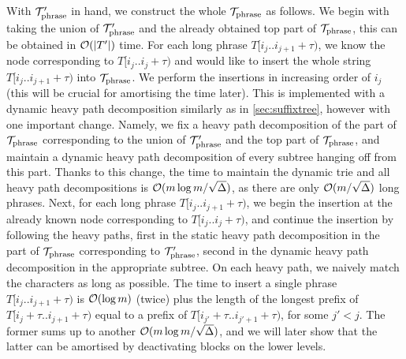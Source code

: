 With $\mathcal{T}_{\mathrm{phrase}}'$ in hand, we construct the whole $\mathcal{T}_{\mathrm{phrase}}$ as follows. We begin with taking the union of $\mathcal{T}_{\mathrm{phrase}}'$ and
the already obtained top part of $\mathcal{T}_{\mathrm{phrase}}$, this can be obtained in $\mathcal{O}(|T'|)$ time. For each long
phrase $T[i_{j}.. i_{j+1}+\tau)$, we know the node corresponding to $T[i_{j}..i_{j}+\tau)$
and would like to insert the whole string $T[i_{j}.. i_{j+1}+\tau)$ into $\mathcal{T}_{\mathrm{phrase}}$.
We perform the insertions in increasing order of $i_j$ (this will be crucial for amortising the time later).
This is implemented with a dynamic heavy path decomposition similarly as in \cref{sec:suffixtree},
however with one important change. Namely, we fix a heavy path decomposition of the
part of $\mathcal{T}_{\mathrm{phrase}}$ corresponding to the union of $\mathcal{T}_{\mathrm{phrase}}'$ and the top part of $\mathcal{T}_{\mathrm{phrase}}$, and maintain a dynamic heavy
path decomposition of every subtree hanging off from this part. Thanks to this change,
the time to maintain the dynamic trie and all heavy path decompositions is $\mathcal{O}(m\log m/\sqrt{\Delta})$,
as there are only $\mathcal{O}(m/\sqrt{\Delta})$ long phrases. Next, for each long phrase
$T[i_{j}..i_{j + 1}+\tau)$, we begin the insertion at the already known node corresponding to $T[i_{j}..i_j+\tau)$,
and continue the insertion by following the heavy paths, first in the static heavy path decomposition
in the part of $\mathcal{T}_{\mathrm{phrase}}$ corresponding to $\mathcal{T}_{\mathrm{phrase}}'$, second in the dynamic heavy path
decomposition in the appropriate subtree.
On each heavy path, we naively match the characters as long as possible.
The time to insert a single phrase $T[i_{j}.. i_{j+1}+\tau)$ is $\mathcal{O}(\log m)$ (twice)
plus the length of the longest prefix
of $T[i_{j}+\tau.. i_{j+1}+\tau)$ equal to a prefix of $T[i_{j'}+\tau.. i_{j'+1}+\tau)$, for some $j'<j$.
The former sums up to another $\mathcal{O}(m\log m/\sqrt{\Delta})$, and we will
later show that the latter can be amortised by deactivating blocks on the lower levels.

